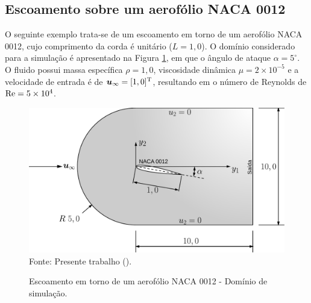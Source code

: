 \subsection{Escoamento sobre um aerofólio NACA 0012} \label{ex:NACA0012}

O seguinte exemplo trata-se de um escoamento em torno de um aerofólio NACA 0012, cujo comprimento da corda é unitário ($L=1,0$). O domínio considerado para a simulação é apresentado na Figura \ref{fig:NACA0012}, em que o ângulo de ataque $\alpha=5^{\circ}$. O fluido possui massa específica $\rho=1,0$, viscosidade dinâmica $\mu=2\times10^{-5}$ e a velocidade de entrada é de $\boldsymbol{u}_\infty=[1,0]^\mathrm{T}$, resultando em o número de Reynolds de $\mathrm{Re}=5\times10^4$.

\begin{figure}[h!]
    \centering
    \caption{Escoamento em torno de um aerofólio NACA 0012 - Domínio de simulação.}
    \includegraphics[width=.7\linewidth]{Figuras/NACA0012/NACA0012.pdf}
    \\Fonte: Presente trabalho (\the\year).
    \label{fig:NACA0012}
\end{figure}

